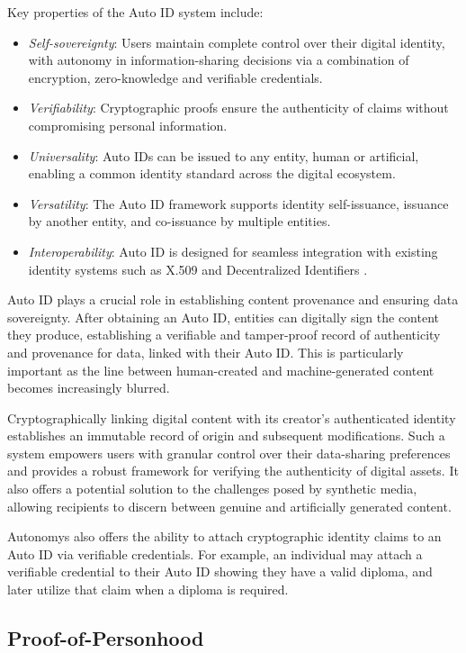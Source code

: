 \documentclass[conference]{IEEEtran}
\begin{document}
Key properties of the Auto ID system include:
\begin{itemize}
    \item \textit{Self-sovereignty}: Users maintain complete control over their digital identity, with autonomy in information-sharing decisions via a combination of encryption, zero-knowledge and verifiable credentials.
    \item \textit{Verifiability}: Cryptographic proofs ensure the authenticity of claims without compromising personal information.
    \item \textit{Universality}: Auto IDs can be issued to any entity, human or artificial, enabling a common identity standard across the digital ecosystem.
    \item \textit{Versatility}: The Auto ID framework supports identity self-issuance, issuance by another entity, and co-issuance by multiple entities.
    \item \textit{Interoperability}: Auto ID is designed for seamless integration with existing identity systems such as X.509 \cite{rfc5280} and Decentralized Identifiers \cite{did-core}.
\end{itemize}

Auto ID plays a crucial role in establishing content provenance and ensuring data sovereignty. After obtaining an Auto ID, entities can digitally sign the content they produce, establishing a verifiable and tamper-proof record of authenticity and provenance for data, linked with their Auto ID. This is particularly important as the line between human-created and machine-generated content becomes increasingly blurred.

Cryptographically linking digital content with its creator's authenticated identity establishes an immutable record of origin and subsequent modifications. Such a system empowers users with granular control over their data-sharing preferences and provides a robust framework for verifying the authenticity of digital assets. It also offers a potential solution to the challenges posed by synthetic media, allowing recipients to discern between genuine and artificially generated content.

Autonomys also offers the ability to attach cryptographic identity claims to an Auto ID via verifiable credentials. For example, an individual may attach a verifiable credential to their Auto ID showing they have a valid diploma, and later utilize that claim when a diploma is required.

\subsection{Proof-of-Personhood}
\end{document}

